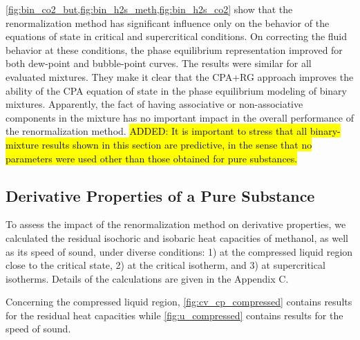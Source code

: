 \documentclass[preprint,12pt,3p]{elsarticle}
\begin{document}
\cref{fig:bin_co2_but,fig:bin_h2s_meth,fig:bin_h2s_co2} show that the renormalization method has significant influence only on the behavior of the equations of state in critical and supercritical conditions.
On correcting the fluid behavior at these conditions, the phase equilibrium representation improved for both dew-point and bubble-point curves.
The results were similar for all evaluated mixtures.
They make it clear that the CPA+RG approach improves the ability of the CPA equation of state in the phase equilibrium modeling of binary mixtures.
Apparently, the fact of having associative or non-associative components in the mixture has no important impact in the overall performance of the renormalization method.
\hl{ADDED: It is important to stress that all binary-mixture results shown in this section are predictive, in the sense that no parameters were used other than those obtained for pure substances.}

\subsection{Derivative Properties of a Pure Substance}

To assess the impact of the renormalization method on derivative properties, we calculated the residual isochoric and isobaric heat capacities of methanol, as well as its speed of sound, under diverse conditions: 1) at the compressed liquid region close to the critical state, 2) at the critical isotherm, and 3) at supercritical isotherms.
Details of the calculations are given in the Appendix C.

Concerning the compressed liquid region, \cref{fig:cv_cp_compressed} contains results for the residual heat capacities while \cref{fig:u_compressed} contains results for the speed of sound.
\end{document}
